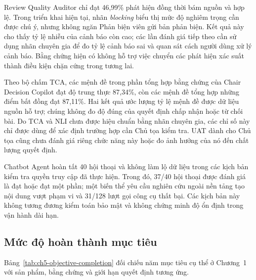 Review Quality Auditor chỉ đạt 46,99\% phát hiện đồng thời bám nguồn và hợp lệ. Trong triển khai hiện tại, nhãn \textit{blocking} biểu thị mức độ nghiêm trọng cần được chú ý, nhưng không ngăn Phản biện viên gửi bản phản biện. Kết quả này cho thấy tỷ lệ nhiễu của cảnh báo còn cao; các lần đánh giá tiếp theo cần sử dụng nhãn chuyên gia để đo tỷ lệ cảnh báo sai và quan sát cách người dùng xử lý cảnh báo. Bằng chứng hiện có không hỗ trợ việc chuyển các phát hiện xác suất thành điều kiện chặn cứng trong tương lai.

Theo bộ chấm TCA, các mệnh đề trong phần tổng hợp bằng chứng của Chair Decision Copilot đạt độ trung thực 87,34\%, còn các mệnh đề tổng hợp những điểm bất đồng đạt 87,11\%. Hai kết quả ước lượng tỷ lệ mệnh đề được dữ liệu nguồn hỗ trợ; chúng không đo độ đúng của quyết định chấp nhận hoặc từ chối bài. Do TCA và NLI chưa được hiệu chuẩn bằng nhãn chuyên gia, các chỉ số này chỉ được dùng để xác định trường hợp cần Chủ tọa kiểm tra. UAT dành cho Chủ tọa cũng chưa đánh giá riêng chức năng này hoặc đo ảnh hưởng của nó đến chất lượng quyết định.

Chatbot Agent hoàn tất 40 hội thoại và không làm lộ dữ liệu trong các kịch bản kiểm tra quyền truy cập đã thực hiện. Trong đó, 37/40 hội thoại được đánh giá là đạt hoặc đạt một phần; một biến thể yêu cầu nghiên cứu ngoài nền tảng tạo nội dung vượt phạm vi và 31/128 lượt gọi công cụ thất bại. Các kịch bản này không tương đương kiểm toán bảo mật và không chứng minh độ ổn định trong vận hành dài hạn.

\subsection{Mức độ hoàn thành mục tiêu}

Bảng~\ref{tab:ch5-objective-completion} đối chiếu năm mục tiêu cụ thể ở Chương~1 với sản phẩm, bằng chứng và giới hạn quyết định tương ứng.

